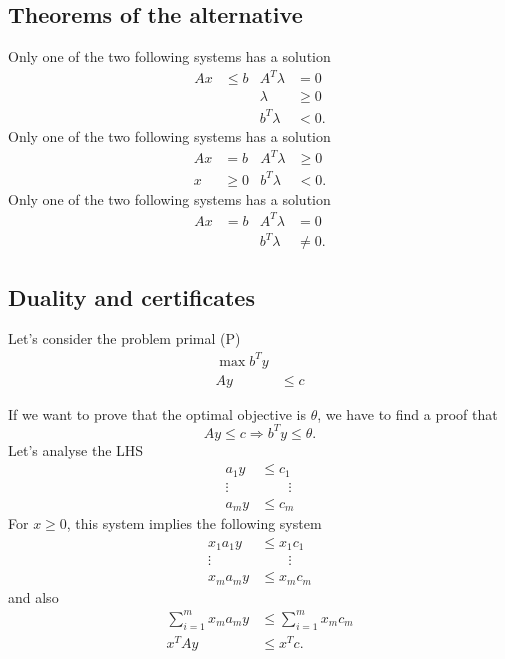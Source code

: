 \subsection{Theorems of the alternative}
\begin{mytheo}
  Only one of the two following systems has a solution
  \begin{align*}
    Ax & \leq b & A^T\lambda & = 0\\
       & & \lambda & \geq 0\\
       & & b^T\lambda & < 0.
  \end{align*}
  Only one of the two following systems has a solution
  \begin{align*}
    Ax & = b & A^T\lambda & \geq 0\\
     x & \geq 0 & b^T\lambda & < 0.
  \end{align*}
  Only one of the two following systems has a solution
  \begin{align*}
    Ax & = b & A^T\lambda & = 0\\
       & & b^T\lambda & \neq 0.
  \end{align*}
\end{mytheo}

\subsection{Duality and certificates}
Let's consider the problem primal (P)
\begin{align*}
  \max b^Ty\\
  Ay & \leq c
\end{align*}

If we want to prove that the optimal objective is $\theta$,
we have to find a proof that
\[ Ay \leq c \Rightarrow b^Ty \leq \theta. \]
Let's analyse the LHS
\begin{align*}
  a_1 y & \leq c_1\\
  \vdots \quad  & \quad\quad \vdots\\
  a_m y & \leq c_m
\end{align*}
For $x \geq 0$, this system implies the following system
\begin{align*}
  x_1 a_1 y & \leq x_1 c_1\\
  \vdots \quad  & \quad\quad \vdots\\
  x_m a_m y & \leq x_m c_m
\end{align*}
and also
\begin{align*}
  \sum_{i=1}^m x_m a_m y & \leq \sum_{i=1}^m x_m c_m\\
  x^T A y & \leq x^T c.
\end{align*}


